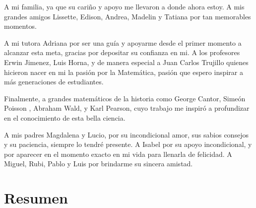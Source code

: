 \documentclass[12pt,oneside]{book}\usepackage[]{graphicx}\usepackage[]{color}
\theoremstyle{definition} %
\begin{document}
\frontmatter
\portadilla
\declaracion
\certificacion










\begin{agradecimiento}

A mi familia, ya que su cariño y apoyo me llevaron a donde ahora estoy.  
A mis grandes amigos Lissette, Edison, Andrea, Madelin y Tatiana por tan memorables momentos.

A mi tutora Adriana por ser una guía y apoyarme desde el primer momento a alcanzar esta meta, gracias por depositar su confianza en mi.
A los profesores Erwin Jimenez, Luis Horna, y de manera especial a Juan Carlos Trujillo quienes hicieron nacer en mi la pasión por la Matemática, pasión que espero inspirar a más generaciones de estudiantes. 

Finalmente, a grandes matemáticos de la historia como George Cantor,  Simeón Poisson , Abraham Wald, y Karl Pearson, cuyo trabajo me inspiró a profundizar en el conocimiento de esta bella ciencia.


\end{agradecimiento}


\begin{dedicatoria}

A mis padres Magdalena y Lucio, por su incondicional amor, sus sabios consejos y su paciencia, siempre lo tendré presente. A Isabel por su apoyo incondicional, y por aparecer en el momento exacto en mi vida para llenarla de felicidad. A Miguel, Rubi, Pablo y Luis por brindarme su sincera amistad.

\end{dedicatoria}



\tableofcontents
\listoffigures
\listoftables






\chapter*{Resumen}
\end{document}
